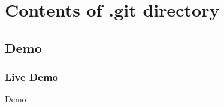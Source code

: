 \section{Contents of .git directory}
\subsection{Demo}
\begin{frame}[c]
    \frametitle{Live Demo}
    \centering
    \Huge{Demo}
\end{frame}

